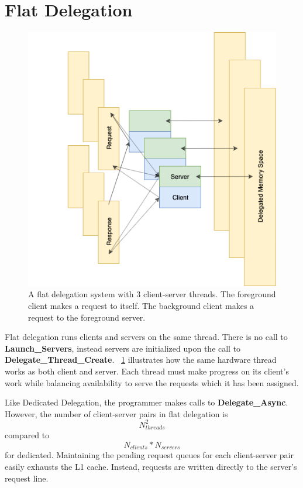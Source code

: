 \documentclass{uicthesi}
\begin{document}
\section{Flat Delegation}
\begin{figure}[ht!]
\centering
\includegraphics[width=0.9\columnwidth]{FIG/flat_async.png}
\caption{A flat delegation system with 3 client-server threads. The foreground client makes a request to itself. The background client makes a request to the foreground server. }
\label{fig:flat_delegation}
\end{figure}

Flat delegation runs clients and servers on the same thread. There is no call to \textbf{Launch\_Servers}, instead servers are initialized upon the call to \textbf{Delegate\_Thread\_Create}. ~\ref{fig:flat_delegation} illustrates how the same hardware thread works as both client and server. Each thread must make progress on its client's work while balancing availability to serve the requests which it has been assigned. 

Like Dedicated Delegation, the programmer makes calls to \textbf{Delegate\_Async}. However, the number of client-server pairs in flat delegation is 
\begin{displaymath}
N_{threads}^2 
\end{displaymath}
compared to 
\begin{displaymath}
N_{clients} * N_{servers}
\end{displaymath} 
for dedicated. Maintaining the pending request queues for each client-server pair easily exhausts the L1 cache. Instead, requests are written directly to the server's request line. 
\end{document}
